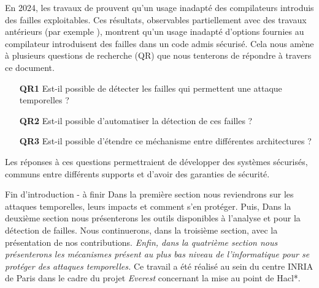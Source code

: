 En 2024, les travaux de \citeauthor{schneider2024breakingbadcompilersbreak} \cite{schneider2024breakingbadcompilersbreak} prouvent qu'un usage inadapté des compilateurs introduis des failles exploitables. Ces résultats, observables partiellement avec des travaux antérieurs (par exemple \cite{binsecRel2019}), montrent qu'un usage inadapté d'options fournies au compilateur introduisent des failles dans un code admis sécurisé. Cela nous amène à plusieurs questions de recherche (QR) que nous tenterons de répondre à travers ce document.
\begin{enumerate}
    \item[\textbf{QR1}] Est-il possible de détecter les failles qui permettent une attaque temporelles ?
    \item[\textbf{QR2}] Est-il possible d'automatiser la détection de ces failles ?
    \item[\textbf{QR3}] Est-il possible d'étendre ce méchanisme entre différentes architectures ?
\end{enumerate}

Les réponses à ces questions permettraient de développer des systèmes sécurisés, communs entre différents supports et d'avoir des garanties de sécurité.

\begin{Acorriger}{Fin d'introduction - à finir}
    Dans la première section nous reviendrons sur les attaques temporelles, leurs impacts et comment s'en protéger. Puis, Dans la deuxième section nous présenterons les outils disponibles à l'analyse et pour la détection de failles. Nous continuerons, dans la troisième section, avec la présentation de nos contributions. \textit{Enfin, dans la quatrième section nous présenterons les mécanismes présent au plus bas niveau de l'informatique pour se protéger des attaques temporelles.}\medbreak
    Ce travail a été réalisé au sein du centre INRIA de Paris dans le cadre du projet \textit{Everest} concernant la mise au point de Hacl*.
    
\end{Acorriger}
